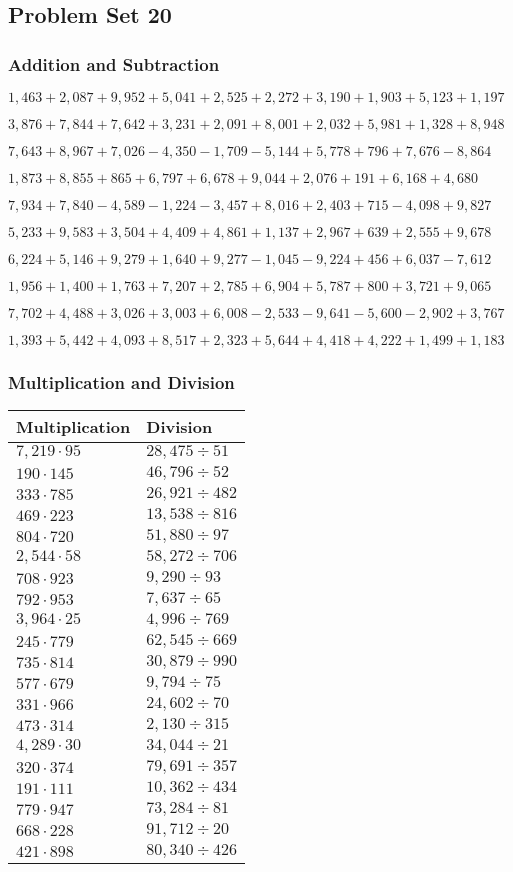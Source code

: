 \hypertarget{problem-set-20-3}{%
\subsection{Problem Set 20}\label{problem-set-20-3}}

\hypertarget{addition-and-subtraction-182}{%
\subsubsection{Addition and
Subtraction}\label{addition-and-subtraction-182}}

\(1,463+2,087+9,952+5,041+2,525+2,272+3,190+1,903+5,123+ 1,197\)

\(3,876+7,844+7,642+3,231+2,091+8,001+2,032+5,981+1,328+8,948\)

\(7,643+8,967+7,026-4,350-1,709-5,144+5,778+796+7,676-8,864\)

\(1,873+8,855+865+6,797+6,678+9,044+2,076+191+6,168+4,680\)

\(7,934+7,840-4,589-1,224-3,457+8,016+2,403+715-4,098+9,827\)

\(5,233+9,583+3,504+4,409+4,861+1,137+2,967+639+2,555+9,678\)

\(6,224+5,146+9,279+1,640+9,277-1,045-9,224+456+6,037-7,612\)

\(1,956+1,400+1,763+7,207+2,785+6,904+5,787+800+3,721+9,065\)

\(7,702+4,488+3,026+3,003+6,008-2,533-9,641-5,600-2,902+3,767\)

\(1,393+5,442+4,093+8,517+2,323+5,644+4,418+4,222+1,499+1,183\)

\hypertarget{multiplication-and-division-181}{%
\subsubsection{Multiplication and
Division}\label{multiplication-and-division-181}}

\begin{longtable}[]{@{}ll@{}}
\toprule
Multiplication & Division\tabularnewline
\midrule
\endhead
\(7,219\cdot95\) & \(28,475÷51\)\tabularnewline
\(190\cdot145\) & \(46,796÷52\)\tabularnewline
\(333\cdot785\) & \(26,921÷482\)\tabularnewline
\(469\cdot223\) & \(13,538÷816\)\tabularnewline
\(804\cdot720\) & \(51,880÷97\)\tabularnewline
\(2,544\cdot58\) & \(58,272÷706\)\tabularnewline
\(708\cdot923\) & \(9,290÷93\)\tabularnewline
\(792\cdot953\) & \(7,637÷65\)\tabularnewline
\(3,964\cdot25\) & \(4,996÷769\)\tabularnewline
\(245\cdot779\) & \(62,545÷669\)\tabularnewline
\(735\cdot814\) & \(30,879÷990\)\tabularnewline
\(577\cdot679\) & \(9,794÷75\)\tabularnewline
\(331\cdot966\) & \(24,602÷70\)\tabularnewline
\(473\cdot314\) & \(2,130÷315\)\tabularnewline
\(4,289\cdot30\) & \(34,044÷21\)\tabularnewline
\(320\cdot374\) & \(79,691÷357\)\tabularnewline
\(191\cdot111\) & \(10,362÷434\)\tabularnewline
\(779\cdot947\) & \(73,284÷81\)\tabularnewline
\(668\cdot228\) & \(91,712÷20\)\tabularnewline
\(421\cdot898\) & \(80,340÷426\)\tabularnewline
\bottomrule
\end{longtable}

